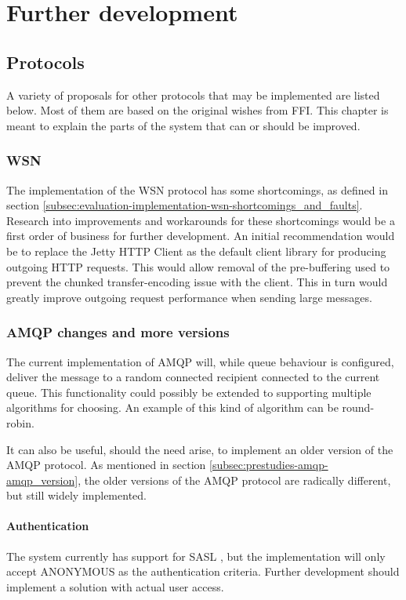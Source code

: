 
\chapter{Further development}

\section{Protocols}
A variety of proposals for other protocols that may be implemented are listed below. Most of them are based on the original wishes from FFI. This chapter is meant to explain the parts of the system that can or should be improved.

\subsection{WSN}
The implementation of the WSN protocol has some shortcomings, as defined in section \ref{subsec:evaluation-implementation-wsn-shortcomings_and_faults}. Research into improvements and workarounds for these shortcomings would be a first order of business for further development. An initial recommendation would be to replace the Jetty HTTP Client as the default client library for producing outgoing HTTP requests. This would allow removal of the pre-buffering used to prevent the chunked transfer-encoding issue with the client. This in turn would greatly improve outgoing request performance when sending large messages.

\subsection{AMQP changes and more versions}
The current implementation of AMQP will, while queue behaviour is configured, deliver the message to a random connected recipient connected to the current queue. This functionality could possibly be extended to supporting multiple algorithms for choosing. An example of this kind of algorithm can be round-robin.

It can also be useful, should the need arise, to implement an older version of the AMQP protocol. As mentioned in section \ref{subsec:prestudies-amqp-amqp_version}, the older versions of the AMQP protocol are radically different, but still widely implemented.

\subsubsection{Authentication}
The system currently has support for SASL \cite{sasl}, but the implementation will only accept ANONYMOUS as the authentication criteria. Further development should implement a solution with actual user access. 

